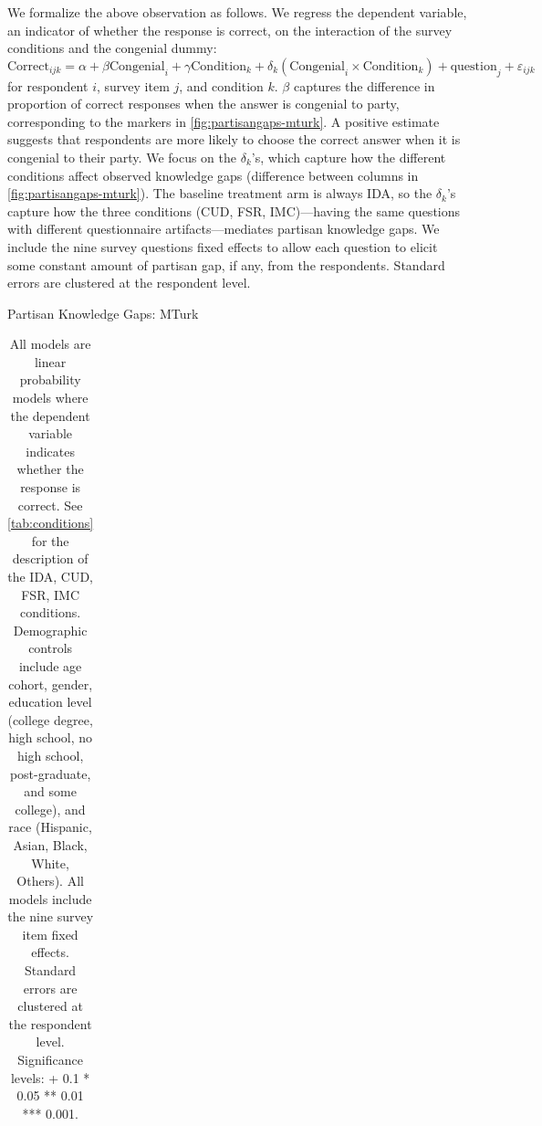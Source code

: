 \documentclass[12pt, letterpaper]{article}
\begin{document}
	
	We formalize the above observation as follows. We regress the dependent variable, an indicator of whether the response is correct, on the interaction of the survey conditions and the congenial dummy:
	\begin{equation}\label{eq:partisangap-mturk}
	\text{Correct}_{ijk} = \alpha + \beta \text{Congenial}_i + \gamma \text{Condition}_k + \delta_k (\text{Congenial}_i \times \text{Condition}_k) + \text{question}_j + \varepsilon_{ijk}
	\end{equation}
	for respondent $i$, survey item $j$, and condition $k$. $\beta$ captures the difference in proportion of correct responses when the answer is congenial to party, corresponding to the markers in \cref{fig:partisangaps-mturk}. A positive estimate suggests that respondents are more likely to choose the correct answer when it is congenial to their party. We focus on the $\delta_k$'s, which capture how the different conditions affect observed knowledge gaps (difference between columns in \cref{fig:partisangaps-mturk}). The baseline treatment arm is always IDA, so the $\delta_k$'s capture how the three conditions (CUD, FSR, IMC)---having the same questions with different questionnaire artifacts---mediates partisan knowledge gaps.
	We include the nine survey questions fixed effects to allow each question to elicit some constant amount of partisan gap, if any, from the respondents. Standard errors are clustered at the respondent level.
	
	\begin{table}[t] \centering \small \setlength\tabcolsep{0 pt} \setlength{\defaultaddspace}{0pt}
		\def\sym#1{\ifmmode^{#1}\else\(^{#1}\)\fi}
		\caption{Partisan Knowledge Gaps: MTurk}
		\label{tab:partisangaps-mturk}
		\begin{adjustbox}{max width=\textwidth}
			\begin{tabular}{l*{6}{D{.}{.}{-1}}}
				\toprule
				
				\bottomrule
			\end{tabular}
		\end{adjustbox}
		\caption*{\footnotesize All models are linear probability models where the dependent variable indicates whether the response is correct.
			See \cref{tab:conditions} for the description of the IDA, CUD, FSR, IMC conditions.
			Demographic controls include age cohort, gender, education level (college degree, high school, no high school, post-graduate, and some college), and race (Hispanic, Asian, Black, White, Others). All models include the nine survey item fixed effects. Standard errors are clustered at the respondent level. Significance levels: + 0.1 * 0.05 ** 0.01 *** 0.001.}
	\end{table}
	
\end{document}
